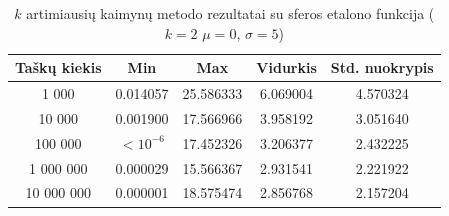 \begin{table}[H]
    \centering
    \begin{tabular}{|c|c|c|c|c|}
        \hline
        \textbf{Taškų kiekis} & \textbf{Min} & \textbf{Max} & \textbf{Vidurkis} & \textbf{Std. nuokrypis} \\ \hline
        1 000        & 0.014057 & 25.586333 & 6.069004 & 4.570324 \\ \hline
        10 000       & 0.001900 & 17.566966 & 3.958192 & 3.051640 \\ \hline
        100 000      & $<10^{-6}$ & 17.452326 & 3.206377 & 2.432225 \\ \hline
        1 000 000    & 0.000029 & 15.566367 & 2.931541 & 2.221922 \\ \hline
        10 000 000   & 0.000001 & 18.575474 & 2.856768 & 2.157204 \\ \hline
    \end{tabular}
    \caption{$k$ artimiausių kaimynų metodo rezultatai su sferos etalono funkcija ($k = 2$ $\mu = 0$, $\sigma = 5$)}
\end{table}